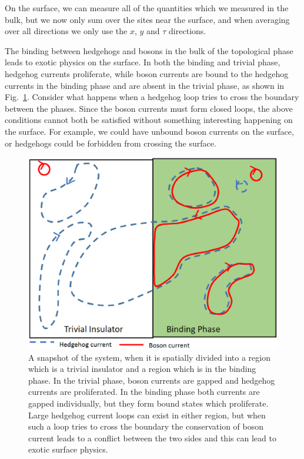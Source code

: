 \documentclass[prb,twocolumn]{revtex4-1}
\begin{document}
On the surface, we can measure all of the quantities which we measured in the bulk, but we now only sum over the sites near the surface, and when averaging over all directions we only use the $x$, $y$ and $\tau$ directions. 

The binding between hedgehogs and bosons in the bulk of the topological phase leads to exotic physics on the surface. In both the binding and trivial phase, hedgehog currents proliferate, while boson currents are bound to the hedgehog currents in the binding phase and are absent in the trivial phase, as shown in Fig.~\ref{surface}. Consider what happens when a hedgehog loop tries to cross the boundary between the phases. Since the boson currents must form closed loops, the above conditions cannot both be satisfied without something interesting happening on the surface. For example, we could have unbound boson currents on the surface, or hedgehogs could be forbidden from crossing the surface.



\begin{figure}
\includegraphics[width=\linewidth]{figures/surface.eps}
\caption{A snapshot of the system, when it is spatially divided into a region which is a trivial insulator and a region which is in the binding phase. In the trivial phase, boson currents are gapped and hedgehog currents are proliferated. In the binding phase both currents are gapped individually, but they form bound states which proliferate. Large hedgehog current loops can exist in either region, but when such a loop tries to cross the boundary the conservation of boson current leads to a conflict between the two sides and this can lead to exotic surface physics. }
\label{surface}
\end{figure}
\end{document}
